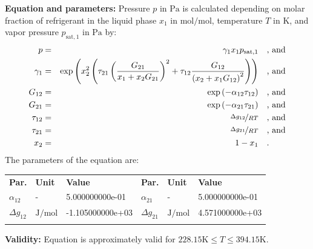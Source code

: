 \textbf{Equation and parameters:}
\newline
%
Pressure $p$ in $\si{\pascal}$ is calculated depending on molar fraction of refrigerant in the liquid phase $x_1$ in $\si{\mole\per\mole}$, temperature $T$ in $\si{\kelvin}$, and vapor pressure $p_\mathrm{sat,1}$ in $\si{\pascal}$ by:
%
\begin{equation*}
\begin{split}
p &=& \gamma_1 x_1 p_\mathrm{sat,1} & \quad\text{, and} \\
\gamma_1 &=& \exp \left( x_2^2 \left( \tau_{21} \left( \frac{G_{21}}{x_1 + x_2 G_{21}} \right) ^2 + \tau_{12} \frac{G_{12}}{\left( x_2 + x_1 G_{12} \right) ^2}\right) \right) & \quad\text{, and} \\
G_{12} &=& \exp \left( -\alpha_{12} \tau_{12} \right) & \quad\text{, and} \\
G_{21} &=& \exp \left( -\alpha_{21} \tau_{21} \right) & \quad\text{, and} \\
\tau_{12} &=& \nicefrac{\Delta g_{12}}{R T} & \quad\text{, and} \\
\tau_{21} &=& \nicefrac{\Delta g_{21}}{R T} & \quad\text{, and} \\
x_2 &=& 1 - x_1  & \quad\text{.} \\
\end{split}
\end{equation*}
%
The parameters of the equation are:
%
\begin{longtable}[l]{lll|lll}
\toprule
\addlinespace
\textbf{Par.} & \textbf{Unit} & \textbf{Value} &	\textbf{Par.} & \textbf{Unit} & \textbf{Value} \\
\addlinespace
\midrule
\endhead

\bottomrule
\endfoot
\bottomrule
\endlastfoot
\addlinespace

$\alpha_{12}$ & - & 5.000000000e-01 & $\alpha_{21}$ & - & 5.000000000e-01 \\
$\Delta g_{12}$ & $\si{\joule\per\mole}$ & -1.105000000e+03 & $\Delta g_{21}$ & $\si{\joule\per\mole}$ & 4.571000000e+03 \\

\addlinespace\end{longtable}

\textbf{Validity:}
\newline
Equation is approximately valid for $228.15 \si{\kelvin} \leq T \leq 394.15 \si{\kelvin}$.
\newline

